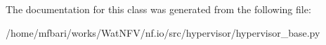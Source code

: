 The documentation for this class was generated from the following file\-:\begin{DoxyCompactItemize}
\item 
/home/mfbari/works/\-Wat\-N\-F\-V/nf.\-io/src/hypervisor/hypervisor\-\_\-base.\-py\end{DoxyCompactItemize}
